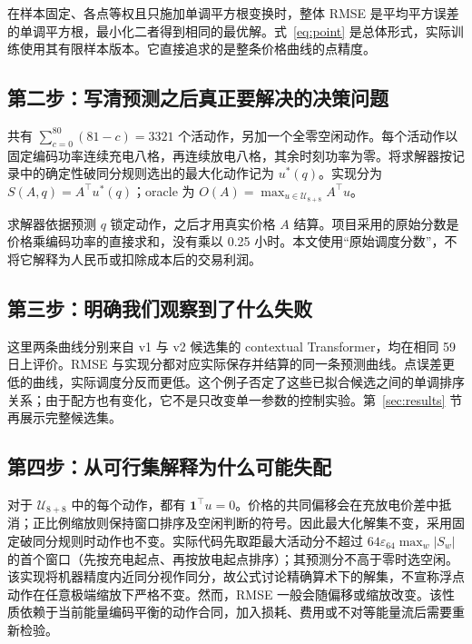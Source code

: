 \documentclass[11pt,a4paper]{article}
\begin{document}
在样本固定、各点等权且只施加单调平方根变换时，整体 RMSE 是平均平方误差的单调平方根，最小化二者得到相同的最优解。式~\eqref{eq:point} 是总体形式，实际训练使用其有限样本版本。它直接追求的是整条价格曲线的点精度。

\subsection{第二步：写清预测之后真正要解决的决策问题}
\EqDispatch
共有 $\sum_{c=0}^{80}(81-c)=3321$ 个活动作，另加一个全零空闲动作。每个活动作以固定编码功率连续充电八格，再连续放电八格，其余时刻功率为零。将求解器按记录中的确定性破同分规则选出的最大化动作记为 $u^*(q)$。实现分为 $S(A,q)=A^\top u^*(q)$；oracle 为 $O(A)=\max_{u\in\mathcal U_{8+8}}A^\top u$。

求解器依据预测 $q$ 锁定动作，之后才用真实价格 $A$ 结算。项目采用的原始分数是价格乘编码功率的直接求和，没有乘以 0.25 小时。本文使用“原始调度分数”，不将它解释为人民币或扣除成本后的交易利润。

\subsection{第三步：明确我们观察到了什么失败}
\EqFailure
这里两条曲线分别来自 v1 与 v2 候选集的 contextual Transformer，均在相同 59 日上评价。RMSE 与实现分都对应实际保存并结算的同一条预测曲线。点误差更低的曲线，实际调度分反而更低。这个例子否定了这些已拟合候选之间的单调排序关系；由于配方也有变化，它不是只改变单一参数的控制实验。第~\ref{sec:results} 节再展示完整候选集。

\subsection{第四步：从可行集解释为什么可能失配}
\EqInvariance
对于 $\mathcal U_{8+8}$ 中的每个动作，都有 $\mathbf1^\top u=0$。价格的共同偏移会在充放电价差中抵消；正比例缩放则保持窗口排序及空闲判断的符号。因此最大化解集不变，采用固定破同分规则时动作也不变。实际代码先取距最大活动分不超过 $64\varepsilon_{64}\max_w|S_w|$ 的首个窗口（先按充电起点、再按放电起点排序）；其预测分不高于零时选空闲。该实现将机器精度内近同分视作同分，故公式讨论精确算术下的解集，不宣称浮点动作在任意极端缩放下严格不变。然而，RMSE 一般会随偏移或缩放改变。该性质依赖于当前能量编码平衡的动作合同，加入损耗、费用或不对等能量流后需要重新检验。
\end{document}
